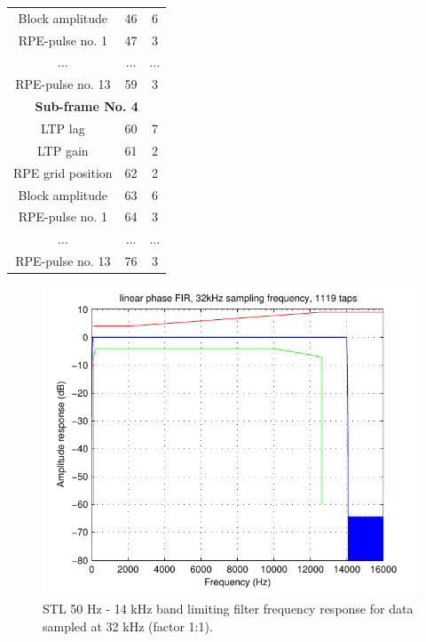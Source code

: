 \documentclass[12pt,a4paper]{book}
\begin{document}
\begin{table}[htb]
\begin{tabular}{|c|c|c|}
Block amplitude   &46   & 6 \\
RPE-pulse no. 1   &47   & 3 \\ 
$\ldots$          &$\ldots$ &$\ldots$\\
RPE-pulse no. 13  &59   & 3 \\ 
\hline
\multicolumn{3}{|c|}{\bf Sub-frame No. 4} \\ 
\hline
LTP lag           &60   & 7 \\
LTP gain          &61   & 2 \\
RPE grid position &62   & 2 \\
Block amplitude   &63   & 6 \\
RPE-pulse no. 1   &64   & 3 \\ 
$\ldots$          &$\ldots$ &$\ldots$\\
RPE-pulse no. 13  &76   & 3 \\ 
\hline
\end{tabular}
\label{T_order}
\end{table}


\begin{figure}[hbtp]
  \begin{center}
  \includegraphics{50-14K}
  \end{center}
  \caption{\SF STL 50 Hz - 14 kHz band limiting filter frequency response for data
               sampled at 32 kHz (factor 1:1).
           \label{50_14k-32k-frq}
          }
\end{figure}
\end{document}
